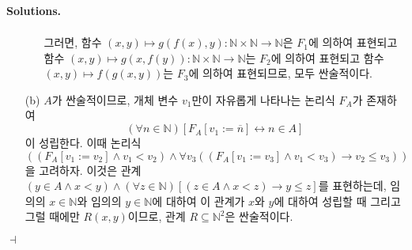 \documentclass[12pt]{paper}
\newenvironment{context}[1][]
{ \noindent \textbf{{#1}.}
}
{ \hfill $ \dashv $
}
\begin{document}
\begin{context}[Solutions]
\begin{enumerate}
\begin{itemize}
\begin{align*}
        \end{align*}
        그러면, 함수 $\left( x , y \right) \mapsto g \left( f \left( x \right) , y \right) : \mathbb{N} \times \mathbb{N} \to \mathbb{N}$은 $F_1$에 의하여 표현되고
        함수 $\left( x , y \right) \mapsto g \left( x , f \left( y \right) \right) : \mathbb{N} \times \mathbb{N} \to \mathbb{N}$는 $F_2$에 의하여 표현되고
        함수 $\left( x , y \right) \mapsto f \left( g \left( x , y \right) \right)$는 $F_3$에 의하여 표현되므로, 모두 싼술적이다.
      \end{itemize}

      \item[(b)] $A$가 싼술적이므로, 개체 변수 $v_1$만이 자유롭게 나타나는 논리식 $F_A$가 존재하여
      $$ \left( \forall n \in \mathbb{N} \right) \left[ F_A \left[ v_1 := \overline{n} \right] \leftrightarrow n \in A \right] $$이 성립한다.
      이때 논리식 $$\left( \left( F_A \left[ v_1 := v_2 \right] \land v_1 < v_2 \right) \land \forall v_3 \left( \left( F_A \left[ v_1 := v_3 \right] \land v_1 < v_3 \right) \rightarrow v_2 \leq v_3 \right) \right)$$을 고려하자.
      이것은 관계 $ \left( y \in A \land x < y \right) \land \left( \forall z \in \mathbb{N} \right) \left[ \left( z \in A \land x < z \right) \rightarrow y \leq z \right] $를 표현하는데,
      임의의 $x \in \mathbb{N}$와 임의의 $y \in \mathbb{N}$에 대하여 이 관계가 $x$와 $y$에 대하여 성립할 때 그리고 그럴 때에만 $R \left( x , y \right)$이므로, 관계 $R \subseteq \mathbb{N}^{2}$은 싼술적이다.


\end{enumerate}
\end{context}
\end{document}
